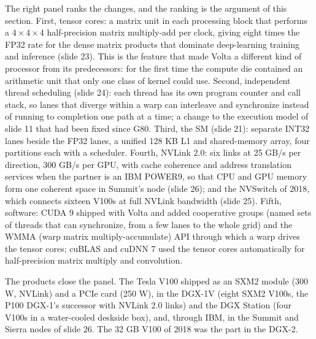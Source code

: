 \documentclass[11pt,letterpaper]{article}
\begin{document}
The right panel ranks the changes, and the ranking is the argument of this section. First, tensor cores: a matrix unit in each processing block that performs a $4\times4\times4$ half-precision matrix multiply-add per clock, giving eight times the FP32 rate for the dense matrix products that dominate deep-learning training and inference (slide 23). This is the feature that made Volta a different kind of processor from its predecessors: for the first time the compute die contained an arithmetic unit that only one class of kernel could use. Second, independent thread scheduling (slide 24): each thread has its own program counter and call stack, so lanes that diverge within a warp can interleave and synchronize instead of running to completion one path at a time; a change to the execution model of slide 11 that had been fixed since G80. Third, the SM (slide 21): separate INT32 lanes beside the FP32 lanes, a unified 128 KB L1 and shared-memory array, four partitions each with a scheduler. Fourth, NVLink 2.0: six links at 25 GB/s per direction, 300 GB/s per GPU, with cache coherence and address translation services when the partner is an IBM POWER9, so that CPU and GPU memory form one coherent space in Summit's node (slide 26); and the NVSwitch of 2018, which connects sixteen V100s at full NVLink bandwidth (slide 25). Fifth, software: CUDA 9 shipped with Volta and added cooperative groups (named sets of threads that can synchronize, from a few lanes to the whole grid) and the WMMA (warp matrix multiply-accumulate) API through which a warp drives the tensor cores; cuBLAS and cuDNN 7 used the tensor cores automatically for half-precision matrix multiply and convolution.

The products close the panel. The Tesla V100 shipped as an SXM2 module (300 W, NVLink) and a PCIe card (250 W), in the DGX-1V (eight SXM2 V100s, the P100 DGX-1's successor with NVLink 2.0 links) and the DGX Station (four V100s in a water-cooled deskside box), and, through IBM, in the Summit and Sierra nodes of slide 26. The 32 GB V100 of 2018 was the part in the DGX-2.
\end{document}
